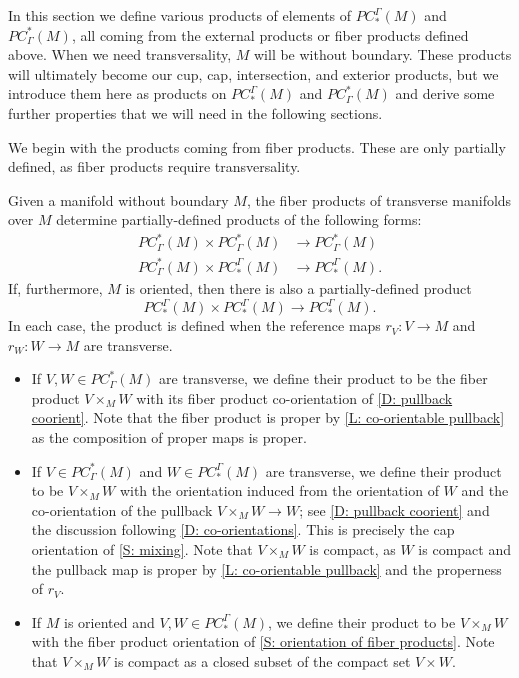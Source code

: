 In this section we define various products of elements of $PC_*^\Gamma(M)$ and $PC^*_\Gamma(M)$, all coming from the external products or fiber products defined above.
When we need transversality, $M$ will be without boundary.
These products will ultimately become our cup, cap, intersection, and exterior products, but we introduce them here as products on $PC_*^\Gamma(M)$ and $PC^*_\Gamma(M)$ and derive some further properties that we will need in the following sections.

We begin with the products coming from fiber products.
These are only partially defined, as fiber products require transversality.

\begin{definition}\label{D: PC products}
	Given a manifold without boundary $M$, the fiber products of transverse manifolds over $M$ determine partially-defined products of the following forms:
	\begin{align*}
		PC^*_\Gamma(M) \times PC^*_\Gamma(M)& \to PC^*_\Gamma(M)\\
		PC^*_\Gamma(M) \times PC_*^\Gamma(M)& \to PC_*^\Gamma(M).
	\end{align*}
	If, furthermore, $M$ is oriented, then there is also a partially-defined product
	$$PC_*^\Gamma(M) \times PC_*^\Gamma(M) \to PC_*^\Gamma(M).$$
	In each case, the product is defined when the reference maps $r_V \colon V \to M$ and $r_W \colon W \to M$ are transverse.

	\begin{itemize}
		\item If $V,W\in PC^*_\Gamma(M)$ are transverse, we define their product to be the fiber product $V \times_M W$ with its fiber product co-orientation of \cref{D: pullback coorient}.
		Note that the fiber product is proper by \cref{L: co-orientable pullback} as the composition of proper maps is proper.

		\item If $V \in PC^*_\Gamma(M)$ and $W \in PC_*^\Gamma(M)$ are transverse, we define their product to be $V \times_M W$ with the orientation induced from the orientation of $W$ and the co-orientation of the pullback $V \times_M W \to W$; see \cref{D: pullback coorient} and the discussion following \cref{D: co-orientations}.
		This is precisely the cap orientation of \cref{S: mixing}.
		Note that $V \times_M W$ is compact, as $W$ is compact and the pullback map is proper by \cref{L: co-orientable pullback} and the properness of $r_V$.

		\item If $M$ is oriented and $V,W \in PC_*^\Gamma(M)$, we define their product to be $V \times_M W$ with the fiber product orientation of \cref{S: orientation of fiber products}.
		Note that $V \times_M W$ is compact as a closed subset of the compact set $V \times W$.
	\end{itemize}


\end{definition}
